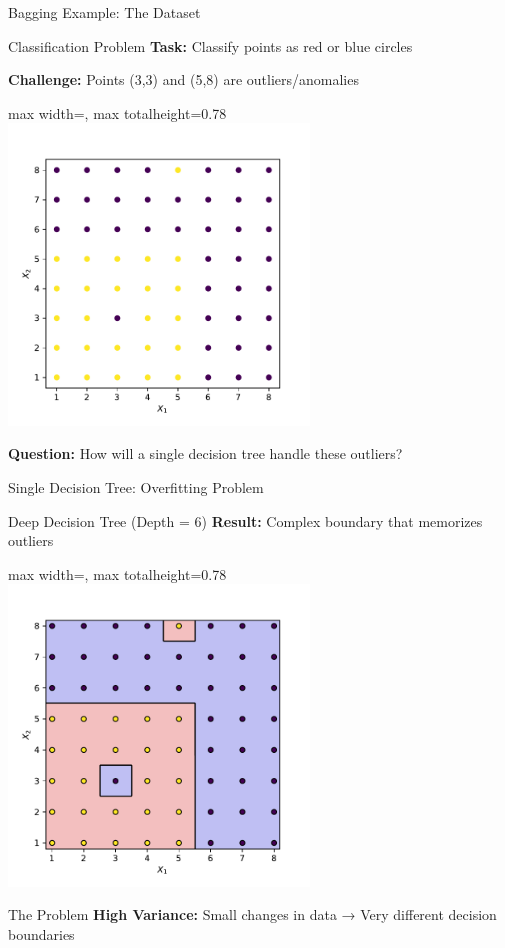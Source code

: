 \documentclass[8pt]{beamer}
\newcommand{\fitpic}[1]{\begin{adjustbox}{max width=\linewidth, max totalheight=0.78\textheight}#1\end{adjustbox}}
\begin{document}
\begin{frame}{Bagging Example: The Dataset}
\begin{alertbox}{Classification Problem}
\textbf{Task:} Classify points as red or blue circles

\textbf{Challenge:} Points (3,3) and (5,8) are outliers/anomalies
\end{alertbox}

  \begin{center}
  \fitpic{\includegraphics[width = 0.6\textwidth]{../assets/ensemble/figures/dataset}}
  \end{center}

\begin{keypointsbox}
\textbf{Question:} How will a single decision tree handle these outliers?
\end{keypointsbox}
\end{frame}

\begin{frame}{Single Decision Tree: Overfitting Problem}
\begin{examplebox}{Deep Decision Tree (Depth = 6)}
\textbf{Result:} Complex boundary that memorizes outliers
\end{examplebox}

  \begin{center}
  \fitpic{\includegraphics[width = 0.6\textwidth]{../assets/ensemble/figures/strong-tree}}
  \end{center}

\begin{alertbox}{The Problem}
\textbf{High Variance:} Small changes in data → Very different decision boundaries
\end{alertbox}
\end{frame}
\end{document}
